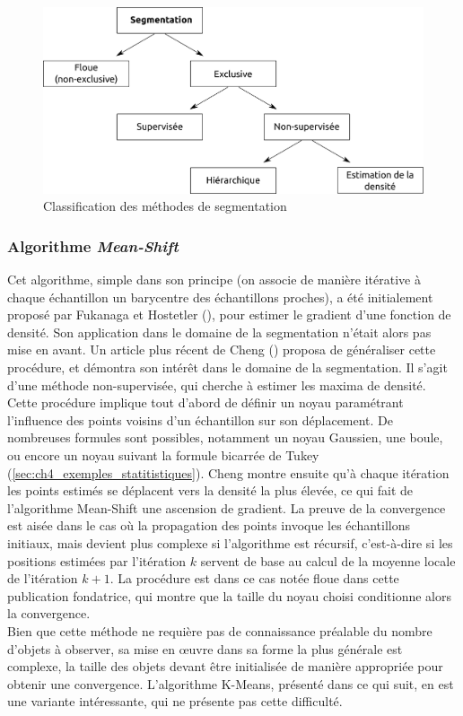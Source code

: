 \begin{figure}[h]
	\begin{center}
		\includegraphics[width=\textwidth]{Chapter5/graphics/segmentation_classification.png}		
		\caption{Classification des méthodes de segmentation}
		\label{fig:ch5_segmentation_classification}
	\end{center}
\end{figure}

\subsubsection{Algorithme \textit{Mean-Shift}}
Cet algorithme, simple dans son principe (on associe de manière itérative à chaque échantillon un barycentre des échantillons proches), a été initialement proposé par Fukanaga et Hostetler (\cite{Fukunaga1975}), pour estimer le gradient d'une fonction de densité. Son application dans le domaine de la segmentation n'était alors pas mise en avant. Un article plus récent de Cheng (\cite{Cheng1995}) proposa de généraliser cette procédure, et démontra son intérêt dans le domaine de la segmentation. Il s'agit d'une méthode non-supervisée, qui cherche à estimer les maxima de densité.\\
Cette procédure implique tout d'abord de définir un \og noyau\fg{} paramétrant l'influence des points voisins d'un échantillon sur son déplacement. De nombreuses formules sont possibles, notamment un noyau Gaussien, une boule, ou encore un noyau suivant la formule bicarrée de Tukey (\ref{sec:ch4_exemples_statitistiques}). Cheng montre ensuite qu'à chaque itération les points estimés se déplacent vers la densité la plus élevée, ce qui fait de l'algorithme Mean-Shift une ascension de gradient. La preuve de la convergence est aisée dans le cas où la propagation des points invoque les échantillons initiaux, mais devient plus complexe si l'algorithme est récursif, c'est-à-dire si les positions estimées par l'itération $k$ servent de base au calcul de la moyenne locale de l'itération $k+1$. La procédure est dans ce cas notée \og floue\fg{} dans cette publication fondatrice, qui montre que la taille du noyau choisi conditionne alors la convergence. \\
Bien que cette méthode ne requière pas de connaissance préalable du nombre d'objets à observer, sa mise en œuvre dans sa forme la plus générale est complexe, la taille des objets devant être initialisée de manière appropriée pour obtenir une convergence. L'algorithme K-Means, présenté dans ce qui suit, en est une variante intéressante, qui ne présente pas cette difficulté.

